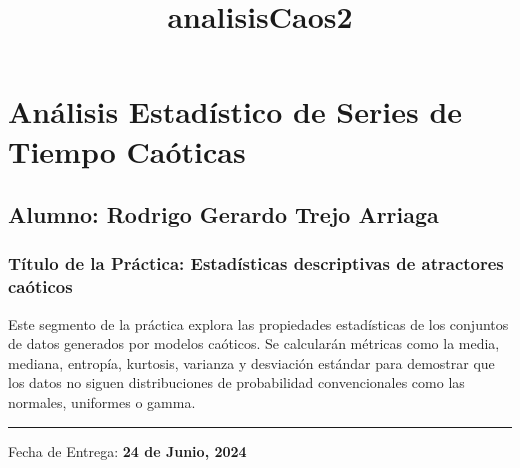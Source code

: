 \documentclass[11pt]{article}
\title{analisisCaos2}
\begin{document}
    
    \maketitle
    
    

    
    \hypertarget{anuxe1lisis-estaduxedstico-de-series-de-tiempo-cauxf3ticas}{%
\section{Análisis Estadístico de Series de Tiempo
Caóticas}\label{anuxe1lisis-estaduxedstico-de-series-de-tiempo-cauxf3ticas}}

\hypertarget{alumno-rodrigo-gerardo-trejo-arriaga}{%
\subsection{Alumno: Rodrigo Gerardo Trejo
Arriaga}\label{alumno-rodrigo-gerardo-trejo-arriaga}}

\hypertarget{tuxedtulo-de-la-pruxe1ctica-estaduxedsticas-descriptivas-de-atractores-cauxf3ticos}{%
\subsubsection{Título de la Práctica: Estadísticas descriptivas de
atractores
caóticos}\label{tuxedtulo-de-la-pruxe1ctica-estaduxedsticas-descriptivas-de-atractores-cauxf3ticos}}

Este segmento de la práctica explora las propiedades estadísticas de los
conjuntos de datos generados por modelos caóticos. Se calcularán
métricas como la media, mediana, entropía, kurtosis, varianza y
desviación estándar para demostrar que los datos no siguen
distribuciones de probabilidad convencionales como las normales,
uniformes o gamma.

\begin{center}\rule{0.5\linewidth}{0.5pt}\end{center}

Fecha de Entrega: \textbf{24 de Junio, 2024}
\end{document}
